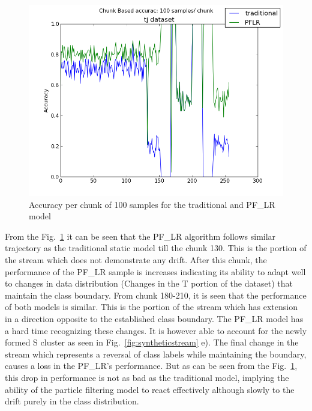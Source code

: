 \documentclass[conference]{IEEEtran}
\begin{document}
\begin{figure}
\captionsetup{justification=centering}
\centering
\includegraphics[scale=0.4]{fig/chunk_100_traditional_PFLR.png}
\caption{Accuracy per chunk of 100 samples for the traditional and PF\_LR model}
\label{fig:chunk_100_tr} 
\end{figure}


From the Fig.~\ref{fig:chunk_100_tr} it can be seen that the PF\_LR algorithm follows similar trajectory as the traditional static model till the chunk 130. This is the portion of the stream which does not demonstrate any drift. After this chunk, the performance of the PF\_LR sample is increases indicating its ability to adapt well to changes in data distribution (Changes in the T portion of the dataset) that maintain the class boundary. From chunk 180-210, it is seen that the performance of both models is similar. This is the portion of the stream which has extension in a direction opposite to the established class boundary. The PF\_LR model has a hard time recognizing these changes. It is however able to account for the newly formed S cluster as seen in Fig.~\ref{fig:syntheticstream} e). The final change in the stream which represents a reversal of class labels while maintaining the boundary, causes a loss in the PF\_LR's performance. But as can be seen from the Fig.~\ref{fig:chunk_100_tr}, this drop in performance is not as bad as the traditional model, implying the ability of the particle filtering model to react effectively although slowly to the drift purely in the class distribution. 
\end{document}
